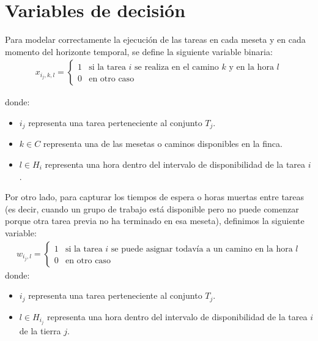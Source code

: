 \section*{Variables de decisión}
Para modelar correctamente la ejecución de las tareas en cada meseta y en cada momento del horizonte temporal, se define la siguiente variable binaria:
\[\begin{aligned}
    x_{i_j,k,l} = \begin{cases} 1 & \text{si la tarea } i \text{ se realiza en el camino } k \text{ y en la hora } l \\ 0 & \text{en otro caso} \end{cases}
\end{aligned}\]

donde:
\begin{itemize}
    \item $i_j$ representa una tarea perteneciente al conjunto $T_j$.
    \item $k \in C$ representa una de las mesetas o caminos disponibles en la finca.
    \item $l \in H_i$ representa una hora dentro del intervalo de disponibilidad de la tarea $i$.
\end{itemize}

Por otro lado, para capturar los tiempos de espera o horas muertas entre tareas
(es decir, cuando un grupo de trabajo está disponible pero no puede comenzar porque otra tarea previa no ha terminado en esa meseta), definimos la siguiente variable:
\[\begin{aligned}
    w_{i_j,l} = \begin{cases} 1 & \text{si la tarea } i \text{ se puede asignar todavía a un camino en la hora } l \\ 0 & \text{en otro caso} \end{cases}
\end{aligned}\] 
donde:
\begin{itemize}
    \item $i_j$ representa una tarea perteneciente al conjunto $T_j$.
    \item $l \in H_{i_j}$ representa una hora dentro del intervalo de disponibilidad de la tarea $i$ de la tierra $j$.
\end{itemize}



